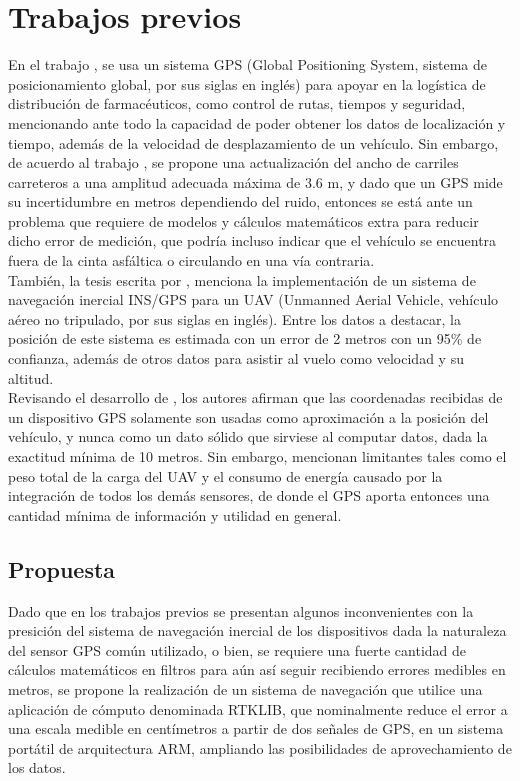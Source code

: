 \section{Trabajos previos}
En el trabajo \cite{de2011diseno}, se usa un sistema GPS (Global Positioning System, sistema de posicionamiento global, por sus siglas en inglés) para apoyar en la logística de distribución de farmacéuticos, como control de rutas, tiempos y seguridad, mencionando ante todo la capacidad de poder obtener los datos de localización y tiempo, además de la velocidad de desplazamiento de un vehículo. Sin embargo, de acuerdo al trabajo \cite{mendoza2004recomendaciones}, se propone una actualización del ancho de carriles carreteros a una amplitud adecuada máxima de 3.6 m, y dado que un GPS mide su incertidumbre en metros dependiendo del ruido, entonces se está ante un problema que requiere de modelos y cálculos matemáticos extra para reducir dicho error de medición, que podría incluso indicar que el vehículo se encuentra fuera de la cinta asfáltica o circulando en una vía contraria. \\

También, la tesis escrita por \cite{ronnback2000developement}, menciona la implementación de un sistema de navegación inercial INS/GPS para un UAV (Unmanned Aerial Vehicle, vehículo aéreo no tripulado, por sus siglas en inglés). Entre los datos a destacar, la posición de este sistema es estimada con un error de 2 metros con un 95\% de confianza, además de otros datos para asistir al vuelo como velocidad y su altitud. \\


Revisando el desarrollo de \cite{maldonado2010controlador}, los autores afirman que las coordenadas recibidas de un dispositivo GPS solamente son usadas como aproximación a la posición del vehículo, y nunca como un dato sólido que sirviese al computar datos, dada la exactitud mínima de 10 metros. Sin embargo, mencionan limitantes tales como el peso total de la carga del UAV y el consumo de energía causado por la integración de todos los demás sensores, de donde el GPS aporta entonces una cantidad mínima de información y utilidad en general. \\


\subsection{Propuesta}
Dado que en los trabajos previos se presentan algunos inconvenientes con la presición del sistema de navegación inercial de los dispositivos dada la naturaleza del sensor GPS común utilizado, o bien, se requiere una fuerte cantidad de cálculos matemáticos en filtros para aún así seguir recibiendo errores medibles en metros, se propone la realización de un sistema de navegación que utilice una aplicación de cómputo denominada RTKLIB, que nominalmente reduce el error a una escala medible en centímetros a partir de dos señales de GPS, en un sistema portátil de arquitectura ARM, ampliando las posibilidades de aprovechamiento de los datos.

